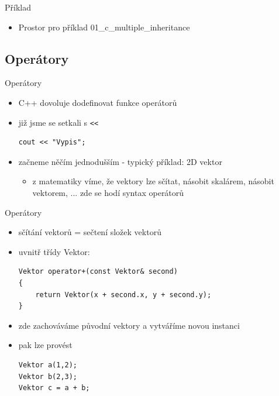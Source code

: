 \documentclass{beamer}
\begin{document}
\begin{xframe}{Příklad}
	\begin{itemize}
		\item Prostor pro příklad 01\_c\_multiple\_inheritance		
	\end{itemize}
\end{xframe}

\subsection{Operátory}

\begin{xframe}{Operátory}
	\begin{itemize}
		\item C++ dovoluje dodefinovat funkce operátorů
		\item již jsme se setkali s \texttt{<<}
\begin{lstlisting}[basicstyle=\fontsize{9}{10}\selectfont\ttfamily]
cout << "Vypis";
\end{lstlisting}
		\item začneme něčím jednodušším - typický příklad: 2D vektor
			\begin{itemize}
				\item z matematiky víme, že vektory lze sčítat, násobit skalárem, násobit vektorem, ... zde se hodí syntax operátorů
			\end{itemize}
	\end{itemize}
\end{xframe}

\begin{xframe}{Operátory}
	\begin{itemize}
		\item sčítání vektorů = sečtení složek vektorů
		\item uvnitř třídy Vektor:
\begin{lstlisting}[basicstyle=\fontsize{9}{10}\selectfont\ttfamily]
Vektor operator+(const Vektor& second)
{
    return Vektor(x + second.x, y + second.y);
}
\end{lstlisting}
		\item zde zachováváme původní vektory a vytváříme novou instanci
		\item pak lze provést
\begin{lstlisting}[basicstyle=\fontsize{9}{10}\selectfont\ttfamily]
Vektor a(1,2);
Vektor b(2,3);
Vektor c = a + b;
\end{lstlisting}
	\end{itemize}
\end{xframe}
\end{document}
